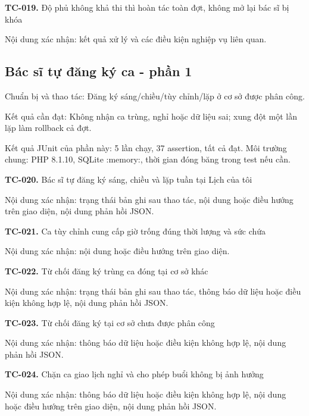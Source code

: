\noindent\textbf{TC-019.} Độ phủ không khả thi thì hoàn tác toàn đợt, không mở lại bác sĩ bị khóa\par
Nội dung xác nhận:\allowbreak{} kết quả xử lý và các điều kiện nghiệp vụ liên quan.\allowbreak{}


\par\vspace{8pt}

\subsection{Bác sĩ tự đăng ký ca - phần 1}
Chuẩn bị và thao tác:\allowbreak{} Đăng ký sáng/\allowbreak{}chiều/\allowbreak{}tùy chỉnh/\allowbreak{}lặp ở cơ sở được phân công.\allowbreak{}

Kết quả cần đạt:\allowbreak{} Không nhận ca trùng, nghỉ hoặc dữ liệu sai; xung đột một lần lặp làm rollback cả đợt.\allowbreak{}

Kết quả JUnit của phần này:\allowbreak{} 5 lần chạy, 37 assertion, tất cả đạt.\allowbreak{} Môi trường chung:\allowbreak{} PHP 8.\allowbreak{}1.\allowbreak{}10, SQLite :\allowbreak{}memory:\allowbreak{}, thời gian đóng băng trong test nếu cần.\allowbreak{}

\noindent\textbf{TC-020.} Bác sĩ tự đăng ký sáng, chiều và lặp tuần tại Lịch của tôi\par
Nội dung xác nhận:\allowbreak{} trạng thái bản ghi sau thao tác, nội dung hoặc điều hướng trên giao diện, nội dung phản hồi JSON.\allowbreak{}

\noindent\textbf{TC-021.} Ca tùy chỉnh cung cấp giờ trống đúng thời lượng và sức chứa\par
Nội dung xác nhận:\allowbreak{} nội dung hoặc điều hướng trên giao diện.\allowbreak{}

\noindent\textbf{TC-022.} Từ chối đăng ký trùng ca đóng tại cơ sở khác\par
Nội dung xác nhận:\allowbreak{} trạng thái bản ghi sau thao tác, thông báo dữ liệu hoặc điều kiện không hợp lệ, nội dung phản hồi JSON.\allowbreak{}

\noindent\textbf{TC-023.} Từ chối đăng ký tại cơ sở chưa được phân công\par
Nội dung xác nhận:\allowbreak{} thông báo dữ liệu hoặc điều kiện không hợp lệ, nội dung phản hồi JSON.\allowbreak{}

\noindent\textbf{TC-024.} Chặn ca giao lịch nghỉ và cho phép buổi không bị ảnh hưởng\par
Nội dung xác nhận:\allowbreak{} thông báo dữ liệu hoặc điều kiện không hợp lệ, nội dung hoặc điều hướng trên giao diện, nội dung phản hồi JSON.\allowbreak{}


